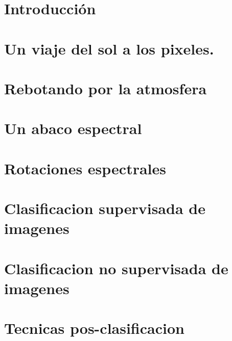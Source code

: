 \documentclass[a4paper]{article}
\begin{document}
\section*{Introducción}
\label{sec:intro}
\newpage 
\section{Un viaje del sol a los pixeles.}
\label{viaje}

\newpage 

\section{Rebotando por la atmosfera}
\label{rebotando}

\newpage 

\section{Un abaco espectral}
\label{abaco}

\newpage 

\section{Rotaciones espectrales}
\label{rotaciones}

\newpage 

\section{Clasificacion supervisada de imagenes}
\label{educando}

\newpage 

\section{Clasificacion no supervisada de imagenes}
\label{otrolado}

\newpage 

\section{Tecnicas pos-clasificacion}
\label{pos}

\newpage 
\end{document}

